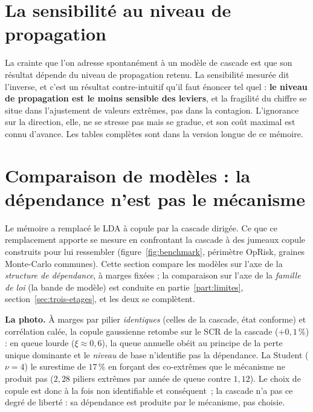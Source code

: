 \section{La sensibilité au niveau de propagation}
\label{sec:sensibilite-propagation}
La crainte que l'on adresse spontanément à un modèle de cascade est que son résultat
dépende du niveau de propagation retenu. La sensibilité mesurée dit l'inverse, et c'est
un résultat contre-intuitif qu'il faut énoncer tel quel : \textbf{le niveau de propagation
est le moins sensible des leviers}, et la fragilité du chiffre se situe dans l'ajustement
de valeurs extrêmes, pas dans la contagion. L'ignorance sur la direction, elle, ne se
stresse pas mais se gradue, et son coût maximal est connu d'avance. Les tables complètes
sont dans la version longue de ce mémoire.

\section{Comparaison de modèles : la dépendance n'est pas le mécanisme}
\label{sec:benchmark}

Le mémoire a remplacé le LDA à copule par la cascade dirigée. Ce que ce remplacement
apporte se mesure en confrontant la cascade à des jumeaux copule construits pour lui
ressembler (figure~\ref{fig:benchmark}, périmètre OpRisk, graines
Monte-Carlo communes). Cette section compare les modèles sur l'axe de la \emph{structure de
dépendance}, à marges fixées ; la comparaison sur l'axe de la \emph{famille de loi} (la bande
de modèle) est conduite en partie~\ref{part:limites}, section~\ref{sec:trois-etages}, et les
deux se complètent.

\textbf{La photo.} À marges par pilier \emph{identiques} (celles de la cascade, état
conforme) et corrélation calée, la copule gaussienne retombe sur le SCR de la cascade
($+0{,}1\,\%$) : en queue lourde ($\xi \approx 0{,}6$), la queue annuelle obéit au principe
de la perte unique dominante et le \emph{niveau} de base n'identifie pas la dépendance. La
Student ($\nu = 4$) le surestime de $17\,\%$ en forçant des co-extrêmes que le mécanisme ne
produit pas ($2{,}28$ piliers extrêmes par année de queue contre $1{,}12$). Le choix de
copule est donc à la fois non identifiable et conséquent~; la cascade n'a pas ce degré de
liberté : sa dépendance est produite par le mécanisme, pas choisie.

